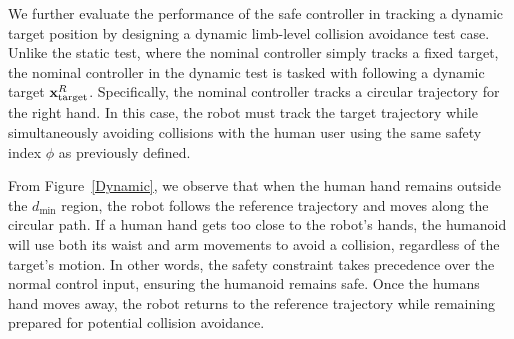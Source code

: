 We further evaluate the performance of the \spark safe controller in tracking a dynamic target position by designing a dynamic limb-level collision avoidance test case.
Unlike the static test, where the nominal controller simply tracks a fixed target, the nominal controller in the dynamic test is tasked with following a dynamic target $\mathbf{x}^R_\mathrm{target}$.
Specifically, the nominal controller tracks a circular trajectory for the right hand.
In this case, the robot must track the target trajectory while simultaneously avoiding collisions with the human user using the same safety index $\phi$ as previously defined.



From Figure~\ref{Dynamic}, we observe that when the human hand remains outside the $d_\mathrm{min}$ region, the robot follows the reference trajectory and moves along the circular path. 
If a human hand gets too close to the robot's hands, the humanoid will use both its waist and arm movements to avoid a collision, regardless of the target's motion. In other words, the safety constraint takes precedence over the normal control input, ensuring the humanoid remains safe.
Once the humans hand moves away, the robot returns to the reference trajectory while remaining prepared for potential collision avoidance.

\begin{figure*}[htbp!]
    \centering
    \vspace{1.5cm}  %
    \vspace{4.5cm}
    \caption{\ref{sec: usecase_safe_auto_real} Limb-level collision avoidance with dynamic humanoid reference poses: when the human hand stays outside \( d_{\min} \), the robot follows the reference trajectory. If it gets too close, the humanoid adjusts its waist and arms to avoid collision, prioritizing safety. Once the hand moves away, the robot resumes its trajectory while remaining prepared.  
 }
    \label{Dynamic}
\end{figure*}

